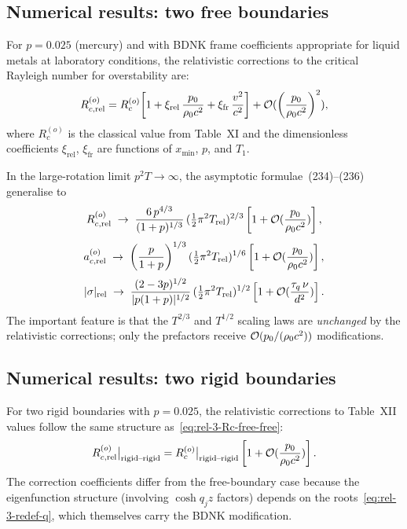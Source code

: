 \subsection{Numerical results: two free boundaries}

For $p = 0.025$ (mercury) and with BDNK frame coefficients
appropriate for liquid metals at laboratory conditions, the
relativistic corrections to the
critical Rayleigh number for overstability are:
\begin{equation}\label{eq:rel-3-Rc-free-free}
  R_{c,\mathrm{rel}}^{(o)}
  = R_{c}^{(o)}\!\left[
    1 + \xi_{\mathrm{rel}}\,\frac{p_{0}}{\rho_0 c^{2}}
    + \xi_{\mathrm{fr}}\,\frac{v^{2}}{c^{2}}
  \right]
  + \mathcal{O}(\left(\frac{p_{0}}{\rho_0 c^{2}}\right)^{2}),
\end{equation}
where $R_{c}^{(o)}$ is the classical value from Table~XI and the
dimensionless coefficients $\xi_{\mathrm{rel}}$, $\xi_{\mathrm{fr}}$ are
functions of $x_{\min}$, $p$, and $T_{1}$.

In the large-rotation limit $p^{2}T\to\infty$, the asymptotic
formulae~(234)--(236) generalise to
\begin{equation}\label{eq:rel-3-Rc-asymp}
  R_{c,\mathrm{rel}}^{(o)}
  \;\to\;
  \frac{6\,p^{4/3}}{(1+p)^{1/3}}\,
  (\tfrac{1}{2}\pi^{2}T_{\mathrm{rel}})^{2/3}
  \left[1 + \mathcal{O}(\frac{p_{0}}{\rho_0 c^{2}})\right],
\end{equation}
\begin{equation}\label{eq:rel-3-ac-asymp}
  a_{c,\mathrm{rel}}^{(o)}
  \;\to\;
  \left(\frac{p}{1+p}\right)^{1/3}
  (\tfrac{1}{2}\pi^{2}T_{\mathrm{rel}})^{1/6}
  \left[1 + \mathcal{O}(\frac{p_{0}}{\rho_0 c^{2}})\right],
\end{equation}
\begin{equation}\label{eq:rel-3-sigma-asymp}
  |\sigma|_{\mathrm{rel}}
  \;\to\;
  \frac{(2-3p)^{1/2}}{|p(1+p)|^{1/2}}\,
  (\tfrac{1}{2}\pi^{2}T_{\mathrm{rel}})^{1/2}
  \left[1 + \mathcal{O}(\frac{\tau_{q}\,\nu}{d^{2}})\right].
\end{equation}
The important feature is that the $T^{2/3}$ and $T^{1/2}$ scaling
laws are \emph{unchanged} by the relativistic corrections; only the
prefactors receive $\mathcal{O}(p_0/(\rho_0 c^{2}))$ modifications.

\subsection{Numerical results: two rigid boundaries}

For two rigid boundaries with $p = 0.025$, the relativistic
corrections to Table~XII values follow the same structure
as~\eqref{eq:rel-3-Rc-free-free}:
\begin{equation}\label{eq:rel-3-Rc-rigid}
  R_{c,\mathrm{rel}}^{(o)}\big|_{\text{rigid--rigid}}
  = R_{c}^{(o)}\big|_{\text{rigid--rigid}}
    \left[1 + \mathcal{O}(\frac{p_{0}}{\rho_0 c^{2}})\right].
\end{equation}
The correction coefficients differ from the free-boundary case because
the eigenfunction structure (involving $\cosh q_{j}z$ factors) depends
on the roots~\eqref{eq:rel-3-redef-q}, which themselves carry the
BDNK modification.

